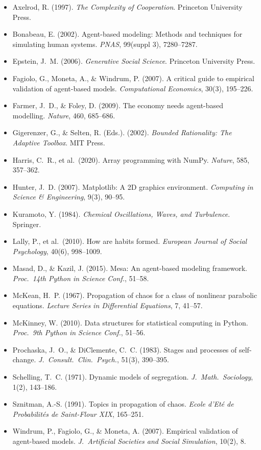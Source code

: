 \begin{itemize}[nosep, leftmargin=*]
\item Axelrod, R. (1997). \textit{The Complexity of Cooperation}. Princeton University Press.
\item Bonabeau, E. (2002). Agent-based modeling: Methods and techniques for simulating human systems. \textit{PNAS}, 99(suppl 3), 7280--7287.
\item Epstein, J.~M. (2006). \textit{Generative Social Science}. Princeton University Press.
\item Fagiolo, G., Moneta, A., \& Windrum, P. (2007). A critical guide to empirical validation of agent-based models. \textit{Computational Economics}, 30(3), 195--226.
\item Farmer, J.~D., \& Foley, D. (2009). The economy needs agent-based modelling. \textit{Nature}, 460, 685--686.
\item Gigerenzer, G., \& Selten, R. (Eds.). (2002). \textit{Bounded Rationality: The Adaptive Toolbox}. MIT Press.
\item Harris, C.~R., et al.~(2020). Array programming with NumPy. \textit{Nature}, 585, 357--362.
\item Hunter, J.~D. (2007). Matplotlib: A 2D graphics environment. \textit{Computing in Science \& Engineering}, 9(3), 90--95.
\item Kuramoto, Y. (1984). \textit{Chemical Oscillations, Waves, and Turbulence}. Springer.
\item Lally, P., et al.~(2010). How are habits formed. \textit{European Journal of Social Psychology}, 40(6), 998--1009.
\item Masad, D., \& Kazil, J. (2015). Mesa: An agent-based modeling framework. \textit{Proc.~14th Python in Science Conf.}, 51--58.
\item McKean, H.~P. (1967). Propagation of chaos for a class of nonlinear parabolic equations. \textit{Lecture Series in Differential Equations}, 7, 41--57.
\item McKinney, W. (2010). Data structures for statistical computing in Python. \textit{Proc.~9th Python in Science Conf.}, 51--56.
\item Prochaska, J.~O., \& DiClemente, C.~C. (1983). Stages and processes of self-change. \textit{J.~Consult.~Clin.~Psych.}, 51(3), 390--395.
\item Schelling, T.~C. (1971). Dynamic models of segregation. \textit{J.~Math.~Sociology}, 1(2), 143--186.
\item Sznitman, A.-S. (1991). Topics in propagation of chaos. \textit{Ecole d'Eté de Probabilités de Saint-Flour XIX}, 165--251.
\item Windrum, P., Fagiolo, G., \& Moneta, A. (2007). Empirical validation of agent-based models. \textit{J.~Artificial Societies and Social Simulation}, 10(2), 8.
\end{itemize}

